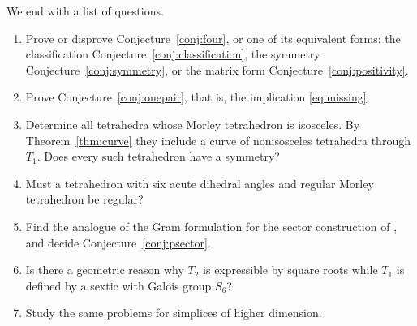 \documentclass[11pt]{article}
\theoremstyle{definition}
\theoremstyle{remark}
\begin{document}
We end with a list of questions.
\begin{enumerate}[label=\arabic*.]
\item Prove or disprove Conjecture~\ref{conj:four}, or one of its equivalent forms: the classification Conjecture~\ref{conj:classification}, the symmetry Conjecture~\ref{conj:symmetry}, or the matrix form Conjecture~\ref{conj:positivity}.
\item Prove Conjecture~\ref{conj:onepair}, that is, the implication \eqref{eq:missing}.
\item Determine all tetrahedra whose Morley tetrahedron is isosceles. By Theorem~\ref{thm:curve} they include a curve of nonisosceles tetrahedra through $T_1$. Does every such tetrahedron have a symmetry?
\item Must a tetrahedron with six acute dihedral angles and regular Morley tetrahedron be regular?
\item Find the analogue of the Gram formulation for the sector construction of \cite[Theorem 6]{TranActa}, and decide Conjecture~\ref{conj:psector}.
\item Is there a geometric reason why $T_2$ is expressible by square roots while $T_1$ is defined by a sextic with Galois group $S_6$?
\item Study the same problems for simplices of higher dimension.
\end{enumerate}
\end{document}
